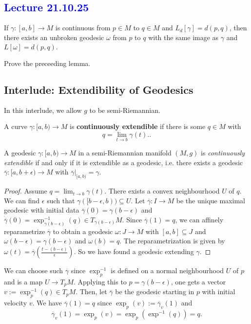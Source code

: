 \subsection{\textcolor{blue}{Lecture 21.10.25}}
\begin{lemma}
    If $\gamma: [a,b] \to M$ is continuous from $p \in M$ to $q \in M$ and $L_d[\gamma]=d(p,q)$, then there exists an unbroken geodesic $\omega$ from $p$ to $q$ with the same image as $\gamma$ and $L[\omega]=d(p,q)$.
\end{lemma}
\begin{ex}
   Prove the preceeding lemma. 
\end{ex}
\subsection*{Interlude: Extendibility of Geodesics}
\begin{note}
   In this interlude, we allow $g$ to be semi-Riemannian. 
\end{note}
\begin{definition}
    A curve $\gamma: [a,b) \to M$ is \textbf{continuously extendible} if there is some $q \in M$ with \[
        q = \lim_{t \to b} \gamma(t).
    .\] 
\end{definition}
\begin{lemma}
    A geodesic $\gamma: [a,b) \to M$ in a semi-Riemannian manifold $(M,g)$ is \emph{continuously extendible} if and only if it is extendible as a geodesic, i.e. there exists a geodesic $\overline{\gamma}: [a,b+\epsilon) \to M$ with $\overline{\gamma}|_{[a,b)} = \gamma$.  
\end{lemma}
\begin{proof}
    Assume $q = \lim_{t \to b} \gamma(t)$. There exists a convex neighbourhood $U$ of $q$. We can find $\epsilon$ such that $\gamma([b-\epsilon,b)) \subseteq U$. Let $\overline{\gamma}: I \to M$ be the unique maximal geodesic with initial data $\overline{\gamma}(0)=\gamma(b-\epsilon)$ and $\dot{\overline{\gamma} }(0)=\exp^{-1}_{\gamma(b-\epsilon)}(q)\in T_{\gamma(b-\epsilon)}M.$ Since $\overline{\gamma}(1)=q$, we can affinely reparametrize $\overline{\gamma}$ to obtain a geodesic $\omega: J \to M$ with $[a,b] \subseteq J$ and $\omega(b-\epsilon) = \gamma(b-\epsilon)$ and $\omega(b)=q$. The reparametrization is given by $\omega(t)=\overline{\gamma}(\frac{t-(b-\epsilon)}{\epsilon}).$ So we have found a geodesic extending $\gamma$.     
\end{proof}
\begin{note}
    We can choose such $\overline{\gamma}$ since $\exp^{-1}_p$ is defined on a normal neighbourhood $U$ of $p$ and is a map $U \to T_pM$. Applying this to $p=\gamma(b-\epsilon)$, one gets a vector $v:=\exp_p^{-1}(q)\in T_pM$. Then, let $\overline{\gamma}$ be the geodesic starting in $p$ with initial velocity $v$. We have $\overline{\gamma}(1)=q$ since $\exp_p(v):=\overline{\gamma}_v(1)$ and \[
    \overline{\gamma}_v(1)=\exp_p(v)=\exp_p(\exp^{-1}(q))=q 
    .\]     
\end{note}
